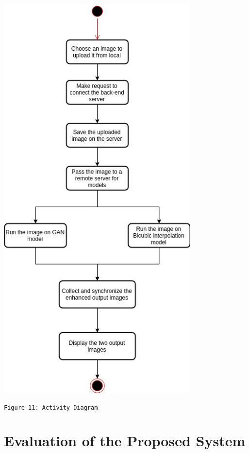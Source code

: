 \documentclass[12pt]{article}
\begin{document}
				\begin{center}
					\vspace{0.1in}
					\includegraphics[width=4in]{Images/ActivityDiagram.jpg}
				
					\texttt{Figure 11: Activity Diagram}
					\vspace{0.1in}
				\end{center}
	\section{Evaluation of the Proposed System}
\end{document}
